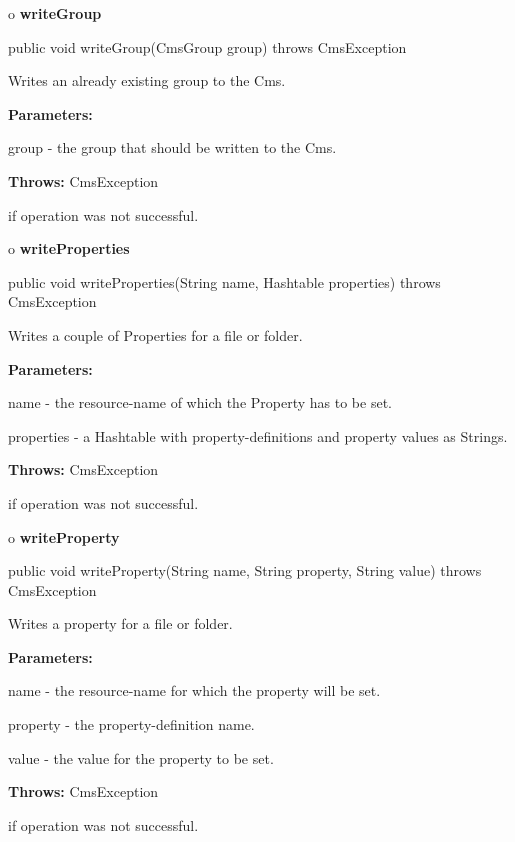 o {\bf writeGroup}

\begin{PRE}
 public void writeGroup(CmsGroup group) throws CmsException
\end{PRE}

\begin{description}
\htmlDD Writes an already existing group to the Cms.

\begin{description}
\item {\bf Parameters:}

group - the group that should be written to the Cms.
\item {\bf Throws:} CmsException

if operation was not successful.
\end{description}

\end{description}

o {\bf writeProperties}

\begin{PRE}
 public void writeProperties(String name,
                             Hashtable properties) throws CmsException
\end{PRE}

\begin{description}
\htmlDD Writes a couple of Properties for a file or folder.

\begin{description}
\item {\bf Parameters:}

name - the resource-name of which the Property has to be set.

properties - a Hashtable with property-definitions and property values as
Strings.
\item {\bf Throws:} CmsException

if operation was not successful.
\end{description}

\end{description}

o {\bf writeProperty}

\begin{PRE}
 public void writeProperty(String name,
                           String property,
                           String value) throws CmsException
\end{PRE}

\begin{description}
\htmlDD Writes a property for a file or folder.

\begin{description}
\item {\bf Parameters:}

name - the resource-name for which the property will be set.

property - the property-definition name.

value - the value for the property to be set.
\item {\bf Throws:} CmsException

if operation was not successful.
\end{description}

\end{description}

